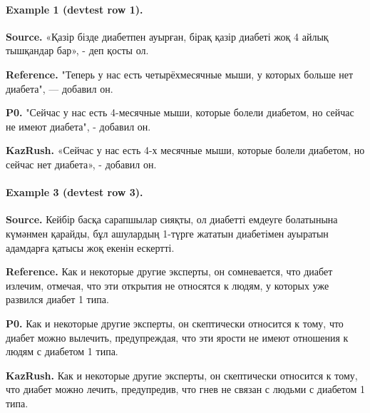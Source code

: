 \paragraph{Example 1 (devtest row 1).}
\noindent\textbf{Source.} {\examplefont «Қазір бізде диабетпен ауырған, бірақ қазір диабеті жоқ 4 айлық тышқандар бар», - деп қосты ол.}\par\smallskip
\noindent\textbf{Reference.} {\examplefont "Теперь у нас есть четырёхмесячные мыши, у которых больше нет диабета", — добавил он.}\par\smallskip
\noindent\textbf{P0.} {\examplefont "Сейчас у нас есть 4-месячные мыши, которые болели диабетом, но сейчас не имеют диабета", - добавил он.}\par\smallskip
\noindent\textbf{KazRush.} {\examplefont «Сейчас у нас есть 4-х месячные мыши, которые болели диабетом, но сейчас нет диабета», - добавил он.}\par\smallskip
\paragraph{Example 3 (devtest row 3).}
\noindent\textbf{Source.} {\examplefont Кейбір басқа сарапшылар сияқты, ол диабетті емдеуге болатынына күмәнмен қарайды, бұл ашулардың 1-түрге жататын диабетімен ауыратын адамдарға қатысы жоқ екенін ескертті.}\par\smallskip
\noindent\textbf{Reference.} {\examplefont Как и некоторые другие эксперты, он сомневается, что диабет излечим, отмечая, что эти открытия не относятся к людям, у которых уже развился диабет 1 типа.}\par\smallskip
\noindent\textbf{P0.} {\examplefont Как и некоторые другие эксперты, он скептически относится к тому, что диабет можно вылечить, предупреждая, что эти ярости не имеют отношения к людям с диабетом 1 типа.}\par\smallskip
\noindent\textbf{KazRush.} {\examplefont Как и некоторые другие эксперты, он скептически относится к тому, что диабет можно лечить, предупредив, что гнев не связан с людьми с диабетом 1 типа.}\par\smallskip
